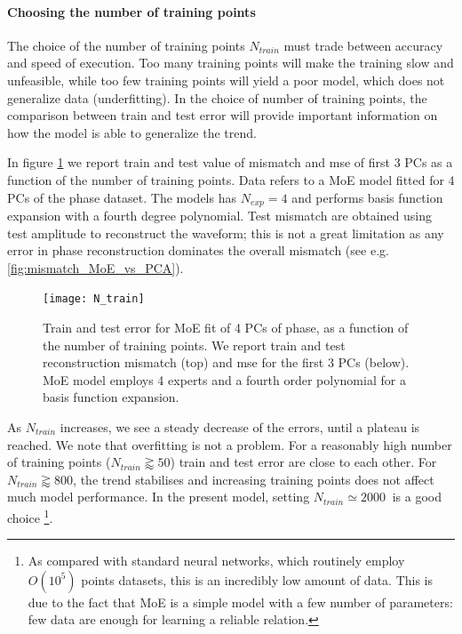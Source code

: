 \paragraph{Choosing the number of training points}
The choice of the number of training points $N_{train}$ must trade between accuracy and speed of execution. Too many training points will make the training slow and unfeasible, while too few training points will yield a poor model, which does not generalize data (underfitting).
In the choice of number of training points, the comparison between train and test error will provide important information on how the model is able to generalize the trend.
\par
In figure \ref{fig:N_train} we report train and test value of mismatch and mse of first 3 PCs as a function of the number of training points. Data refers to a MoE model fitted for 4 PCs of the phase dataset. The models has $N_{exp} = 4$ and performs basis function expansion with a fourth degree polynomial. Test mismatch are obtained using test amplitude to reconstruct the waveform; this is not a great limitation as any error in phase reconstruction dominates the overall mismatch (see e.g. \ref{fig:mismatch_MoE_vs_PCA}).
\begin{figure}
	\centering
    \texttt{[image: N\_train]}
	\caption{Train and test error for MoE fit of 4 PCs of phase, as a function of the number of training points. We report train and test reconstruction mismatch (top) and mse for the first 3 PCs (below).
    MoE model employs 4 experts and a fourth order polynomial for a basis function expansion.
    }
	\label{fig:N_train}
\end{figure}
\par
As $N_{train}$ increases, we see a steady decrease of the errors, until a plateau is reached.
We note that overfitting is not a problem. For a reasonably high number of training points ($N_{train} \gtrapprox 50$) train and test error are close to each other.
For $N_{train} \gtrapprox 800$, the trend stabilises and increasing training points does not affect much model performance.
In the present model, setting $N_{train} \simeq \SI{2000}{}$ is a good choice
\footnote{As compared with standard neural networks, which routinely employ $O(10^5)$ points datasets, this is an incredibly low amount of data. This is due to the fact that MoE is a simple model with a few number of parameters: few data are enough for learning a reliable relation.}.

